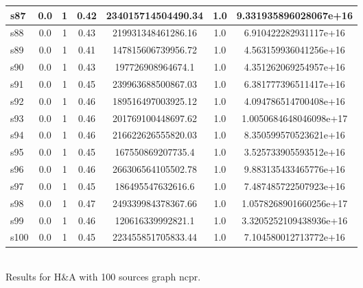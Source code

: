 \documentclass{article}
\begin{document}
\begin{tabular}{|l|c|c|c|c|c|c|}
\hline
s87 &0.0 & 1 & 0.42 & 234015714504490.34 & 1.0 & 9.331935896028067e+16\\
\hline
s88 &0.0 & 1 & 0.43 & 219931348461286.16 & 1.0 & 6.910422282931117e+16\\
\hline
s89 &0.0 & 1 & 0.41 & 147815606739956.72 & 1.0 & 4.563159936041256e+16\\
\hline
s90 &0.0 & 1 & 0.43 & 197726908964674.1 & 1.0 & 4.351262069254957e+16\\
\hline
s91 &0.0 & 1 & 0.45 & 239963688500867.03 & 1.0 & 6.381777396511417e+16\\
\hline
s92 &0.0 & 1 & 0.46 & 189516497003925.12 & 1.0 & 4.094786514700408e+16\\
\hline
s93 &0.0 & 1 & 0.46 & 201769100448697.62 & 1.0 & 1.0050684648046098e+17\\
\hline
s94 &0.0 & 1 & 0.46 & 216622626555820.03 & 1.0 & 8.350599570523621e+16\\
\hline
s95 &0.0 & 1 & 0.45 & 167550869207735.4 & 1.0 & 3.525733905593512e+16\\
\hline
s96 &0.0 & 1 & 0.46 & 266306564105502.78 & 1.0 & 9.883135433465776e+16\\
\hline
s97 &0.0 & 1 & 0.45 & 186495547632616.6 & 1.0 & 7.487485722507923e+16\\
\hline
s98 &0.0 & 1 & 0.47 & 249339984378367.66 & 1.0 & 1.0578268901660256e+17\\
\hline
s99 &0.0 & 1 & 0.46 & 120616339992821.1 & 1.0 & 3.3205252109438936e+16\\
\hline
s100 &0.0 & 1 & 0.45 & 223455851705833.44 & 1.0 & 7.104580012713772e+16\\
\hline
\end{tabular}\\

\noindent Results for H\&A with 100 sources graph ncpr.
\end{document}
